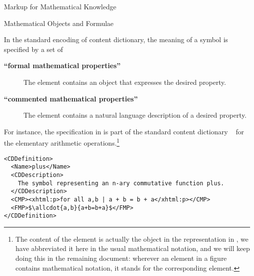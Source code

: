 \begin{tchapter}[id=math-markup]{Markup for Mathematical Knowledge}
\begin{tsection}[id=math-objects]{Mathematical Objects and Formulae}
\begin{tsubsection}[id=math-markup:openmath]{\openmath}
  In the standard encoding of {\openmath} content dictionary, the meaning of a symbol is
  specified by a set of
  \begin{description}
  \item[{\bf{``formal mathematical properties''}}]
    The {} element contains an {\openmath} object that expresses
    the desired property.
  \item[{\bf{``commented mathematical
        properties''}}] The
    {} element contains a natural language description of a
    desired property.
  \end{description}
  For instance, the specification in {} is part of the standard
  {\openmath} content dictionary {}~\cite{URL:omcd-core} for the
  elementary arithmetic operations.\footnote{The content of the
    {} element is actually the {\openmath} object in the
    representation in {}, we have abbreviated it here in the usual
    mathematical notation, and we will keep doing this in the remaining document: wherever
    an {\xml} element in a figure contains mathematical notation, it stands for the
    corresponding {\openmath} element.}
\begin{lstlisting}[label=lst:arith1,language=omCD,mathescape,
  caption={Part of the {\sc OpenMath} Content Dictionary {\snippet{arith1}}.},
  index={CDDefinition,Name,dc:description,CMP,FMP}]
<CDDefinition>
  <Name>plus</Name> 
  <CDDescription>
    The symbol representing an n-ary commutative function plus.
  </CDDescription> 
  <CMP><xhtml:p>for all a,b | a + b = b + a</xhtml:p></CMP>
  <FMP>$\allcdot{a,b}{a+b=b+a}$</FMP> 
</CDDefinition>
\end{lstlisting}


\end{tsubsection}
\end{tsection}
\end{tchapter}
